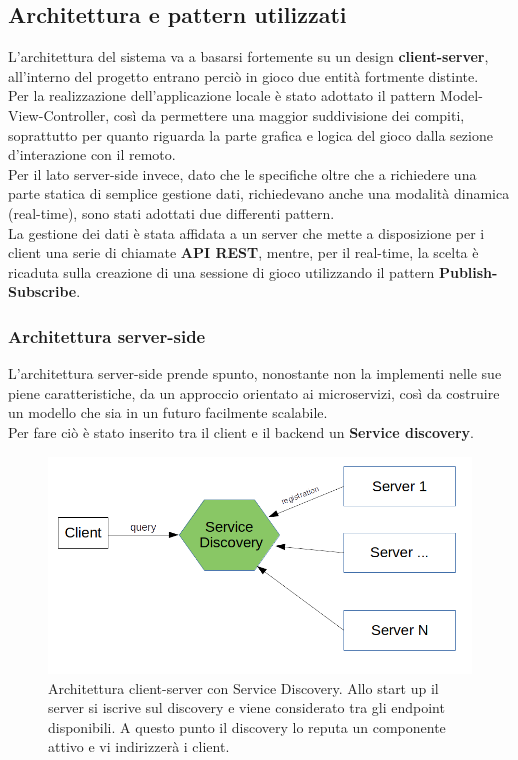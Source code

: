         \subsection[Architettura]{Architettura e pattern utilizzati}\label{subsec:architecture}
         L'architettura del sistema va a basarsi fortemente su un design \textbf{client-server}, all'interno del progetto entrano perciò in gioco due entità fortmente distinte. \\ Per la realizzazione dell'applicazione locale è stato adottato il pattern Model-View-Controller, così da permettere una maggior suddivisione dei compiti, soprattutto per quanto riguarda la parte grafica e logica del gioco dalla sezione d'interazione con il remoto.  \\
        Per il lato server-side invece, dato che le specifiche oltre che a richiedere una parte statica di semplice gestione dati, richiedevano anche una modalità dinamica (real-time), sono stati adottati due differenti pattern.
        \\
        La gestione dei dati è stata affidata a un server che mette a disposizione per i client una serie di chiamate \textbf{API REST}, mentre, per il real-time, la scelta è ricaduta sulla creazione di una sessione di gioco utilizzando il pattern \textbf{Publish-Subscribe}.
        
        
            \subsubsection{Architettura server-side}\label{subsub:architecture:server}
            L'architettura server-side prende spunto, nonostante non la implementi nelle sue piene caratteristiche, da un approccio orientato ai microservizi, così da costruire un modello che sia in un futuro facilmente scalabile. \\
            
            Per fare ciò è stato inserito tra il client e il backend un \textbf{Service discovery}. 
            
            \begin{figure}[h!]
                \includegraphics[scale=0.6]{images/ArchitetturaDiscovery.png}
                \caption{Architettura client-server con Service Discovery. Allo start up il server si iscrive sul discovery e viene considerato tra gli endpoint disponibili. A questo punto il discovery lo reputa un componente attivo e vi indirizzerà i client.}
            \end{figure}

